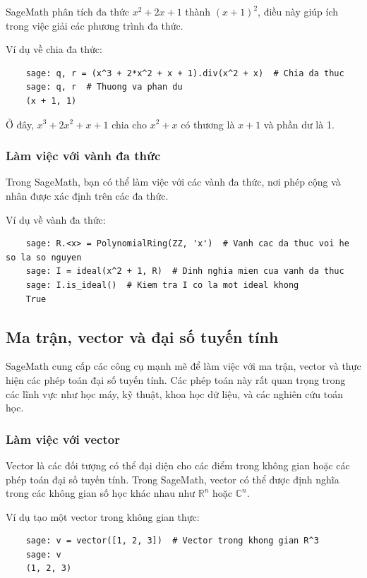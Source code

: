 SageMath phân tích đa thức \(x^2 + 2x + 1\) thành \((x + 1)^2\), điều này giúp ích trong việc giải các phương trình đa thức.

Ví dụ về chia đa thức:

\begin{lstlisting}
	sage: q, r = (x^3 + 2*x^2 + x + 1).div(x^2 + x)  # Chia da thuc
	sage: q, r  # Thuong va phan du
	(x + 1, 1)
\end{lstlisting}

Ở đây, \(x^3 + 2x^2 + x + 1\) chia cho \(x^2 + x\) có thương là \(x + 1\) và phần dư là 1.

\subsubsection{Làm việc với vành đa thức}

Trong SageMath, bạn có thể làm việc với các vành đa thức, nơi phép cộng và nhân được xác định trên các đa thức.

Ví dụ về vành đa thức:

\begin{lstlisting}
	sage: R.<x> = PolynomialRing(ZZ, 'x')  # Vanh cac da thuc voi he so la so nguyen
	sage: I = ideal(x^2 + 1, R)  # Dinh nghia mien cua vanh da thuc
	sage: I.is_ideal()  # Kiem tra I co la mot ideal khong
	True
\end{lstlisting}


\subsection{Ma trận, vector và đại số tuyến tính}

SageMath cung cấp các công cụ mạnh mẽ để làm việc với ma trận, vector và thực hiện các phép toán đại số tuyến tính. Các phép toán này rất quan trọng trong các lĩnh vực như học máy, kỹ thuật, khoa học dữ liệu, và các nghiên cứu toán học.

\subsubsection{Làm việc với vector}

Vector là các đối tượng có thể đại diện cho các điểm trong không gian hoặc các phép toán đại số tuyến tính. Trong SageMath, vector có thể được định nghĩa trong các không gian số học khác nhau như \(\mathbb{R}^n\) hoặc \(\mathbb{C}^n\).

Ví dụ tạo một vector trong không gian thực:

\begin{lstlisting}
	sage: v = vector([1, 2, 3])  # Vector trong khong gian R^3
	sage: v
	(1, 2, 3)
\end{lstlisting}


